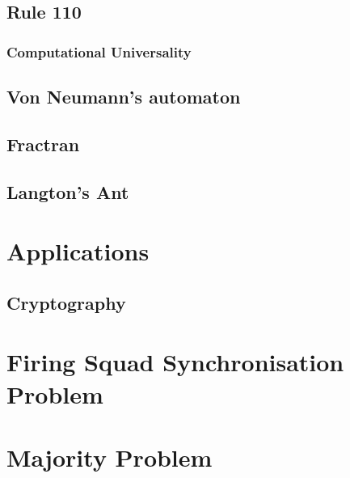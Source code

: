 \documentclass[11pt,a4paper]{article}
\begin{document}
    \subsection{Rule 110}
    \subsubsection{Computational Universality}
    \subsection{Von Neumann's automaton}
    \subsection{Fractran}
    \subsection{Langton's Ant}
\section{Applications}
    \subsection{Cryptography}
\section{Firing Squad Synchronisation Problem}
\section{Majority Problem}


\end{document}
